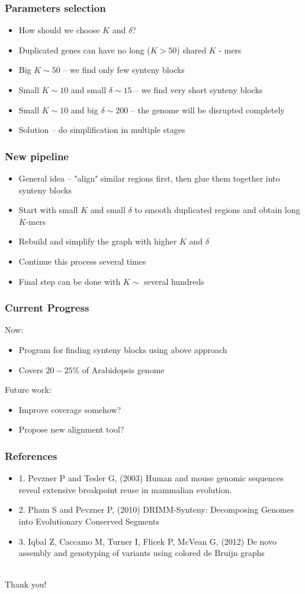 \documentclass[svgnames,14pt]{beamer}
\begin{document}
\begin{frame}
\frametitle{Parameters selection}
\begin{itemize}
\item How should we choose \(K\) and \(\delta\)?
\item Duplicated genes can have no long (\(K > 50 \)) shared \(K\) - mers
\item Big \(K \sim 50\) -- we find only few synteny blocks
\item Small \(K \sim 10\) and small \(\delta \sim 15\) -- we find very short synteny blocks
\item Small \(K \sim 10\) and big \(\delta \sim 200 \) -- the genome will be disrupted completely
\pause \item Solution -- do simplification in multiple stages 
\end{itemize}
\end{frame}

\begin{frame}
\frametitle{New pipeline}
\begin{itemize}
\item General idea -- "align" similar regions first, then glue them together into synteny blocks
\item Start with small \(K\) and small \(\delta\) to smooth duplicated regions and obtain long \(K\)-mers
\item Rebuild and simplify the graph with higher \(K\) and \(\delta\)
\item Continue this process several times
\item Final step can be done with \(K \sim \) several hundreds
\end{itemize}
\end{frame}

\begin{frame}
\frametitle{Current Progress}
Now:
\begin{itemize}
\item Program for finding synteny blocks using above approach
\item Covers \( 20-25 \% \) of Arabidopsis genome
\end{itemize}
Future work:
\begin{itemize}
\item Improve coverage somehow?
\item Propose new alignment tool?
\end{itemize}
\end{frame}

\begin{frame}
\frametitle{References}
\begin{itemize}
\item 1. Pevzner P and Tesler G, (2003) Human and mouse genomic sequences reveal extensive breakpoint reuse in mammalian evolution. 
\item 2. Pham S and Pevzner P, (2010) DRIMM-Synteny: Decomposing Genomes into Evolutionary Conserved Segments
\item 3. Iqbal Z, Caccamo M, Turner I, Flicek P, McVean G, (2012) De novo assembly and genotyping of variants using colored de Bruijn graphs
\end{itemize}
\end{frame}

\begin{center}
\hfill \huge \\
\vspace{60pt}
Thank you!
\end{center}
\end{document}
